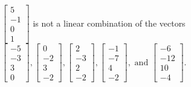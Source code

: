 \begin{exercise}
\begin{exerciseStatement}
  \end{exerciseStatement}
  \begin{exerciseAnswer}
   \(\left[\begin{array}{c}
5 \\
-1 \\
0 \\
1
\end{array}\right]\) 
  	 is not  
	a linear combination of the vectors \(\left[\begin{array}{c}
-5 \\
-3 \\
3 \\
0
\end{array}\right] , \left[\begin{array}{c}
0 \\
-2 \\
3 \\
-2
\end{array}\right] , \left[\begin{array}{c}
2 \\
-3 \\
2 \\
-2
\end{array}\right] , \left[\begin{array}{c}
-1 \\
-7 \\
4 \\
-2
\end{array}\right] , \text{ and } \left[\begin{array}{c}
-6 \\
-12 \\
10 \\
-4
\end{array}\right]\).

	
  


  \end{exerciseAnswer}
\end{exercise}